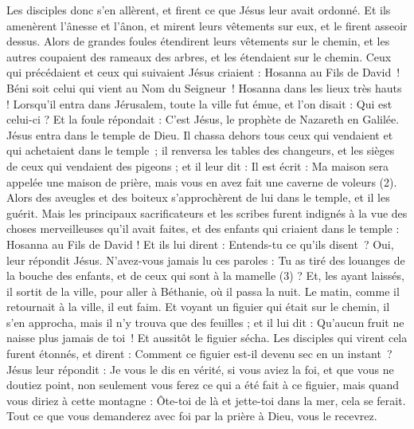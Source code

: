 \begin{multicols}{2}
{Les disciples donc s'en allèrent, et firent ce que Jésus leur avait ordonné.
Et ils amenèrent l'ânesse et l'ânon, et mirent leurs vêtements sur eux, et le firent asseoir dessus.
Alors de grandes foules étendirent leurs vêtements sur le chemin, et les autres coupaient des rameaux des arbres, et les étendaient sur le chemin.
Ceux qui précédaient et ceux qui suivaient Jésus criaient : Hosanna au Fils de David ! Béni soit celui qui vient au Nom du Seigneur ! Hosanna dans les lieux très hauts !
Lorsqu’il entra dans Jérusalem, toute la ville fut émue, et l’on disait : Qui est celui-ci ?
Et la foule répondait : C’est Jésus, le prophète de Nazareth en Galilée.
Jésus entra dans le temple de Dieu. Il chassa dehors tous ceux qui vendaient et qui achetaient dans le temple ; il renversa les tables des changeurs, et les sièges de ceux qui vendaient des pigeons ;
et il leur dit : Il est écrit : Ma maison sera appelée une maison de prière, mais vous en avez fait une caverne de voleurs (2).
Alors des aveugles et des boiteux s’approchèrent de lui dans le temple, et il les guérit.
Mais les principaux sacrificateurs et les scribes furent indignés à la vue des choses merveilleuses qu'il avait faites, et des enfants qui criaient dans le temple : Hosanna au Fils de David !
Et ils lui dirent : Entends-tu ce qu’ils disent ? Oui, leur répondit Jésus. N'avez-vous jamais lu ces paroles : Tu as tiré des louanges de la bouche des enfants, et de ceux qui sont à la mamelle (3) ?
Et, les ayant laissés, il sortit de la ville, pour aller à Béthanie, où il passa la nuit.
Le matin, comme il retournait à la ville, il eut faim.
Et voyant un figuier qui était sur le chemin, il s'en approcha, mais il n'y trouva que des feuilles ; et il lui dit : Qu'aucun fruit ne naisse plus jamais de toi ! Et aussitôt le figuier sécha.
Les disciples qui virent cela furent étonnés, et dirent : Comment ce figuier est-il devenu sec en un instant ?
Jésus leur répondit : Je vous le dis en vérité, si vous aviez la foi, et que vous ne doutiez point, non seulement vous ferez ce qui a été fait à ce figuier, mais quand vous diriez à cette montagne : Ôte-toi de là et jette-toi dans la mer, cela se ferait.
Tout ce que vous demanderez avec foi par la prière à Dieu, vous le recevrez.
}
\end{multicols}
